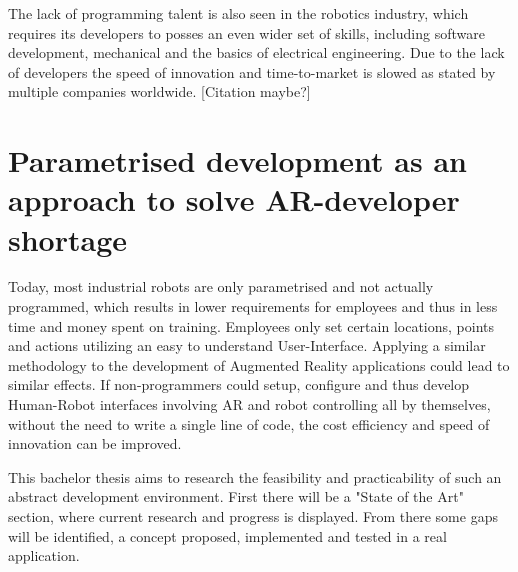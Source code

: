 The lack of programming talent is also seen in the robotics industry, which requires its developers to posses an even wider set of skills, including software development, mechanical and the basics of electrical engineering. Due to the lack of developers the speed of innovation and time-to-market is slowed as stated by multiple companies worldwide. [Citation maybe?]

\section{Parametrised development as an approach to solve AR-developer shortage}
\label{Section:PARRHIApproach}
Today, most industrial robots are only parametrised and not actually programmed, which results in lower requirements for employees and thus in less time and money spent on training. Employees only set certain locations, points and actions utilizing an easy to understand User-Interface. Applying a similar methodology to the development of Augmented Reality applications could lead to similar effects. If non-programmers could setup, configure and thus develop Human-Robot interfaces involving AR and robot controlling all by themselves, without the need to write a single line of code, the cost efficiency and speed of innovation can be improved.

This bachelor thesis aims to research the feasibility and practicability of such an abstract development environment. First there will be a "State of the Art" section, where current research and progress is displayed. From there some gaps will be identified, a concept proposed, implemented and tested in a real application.



























